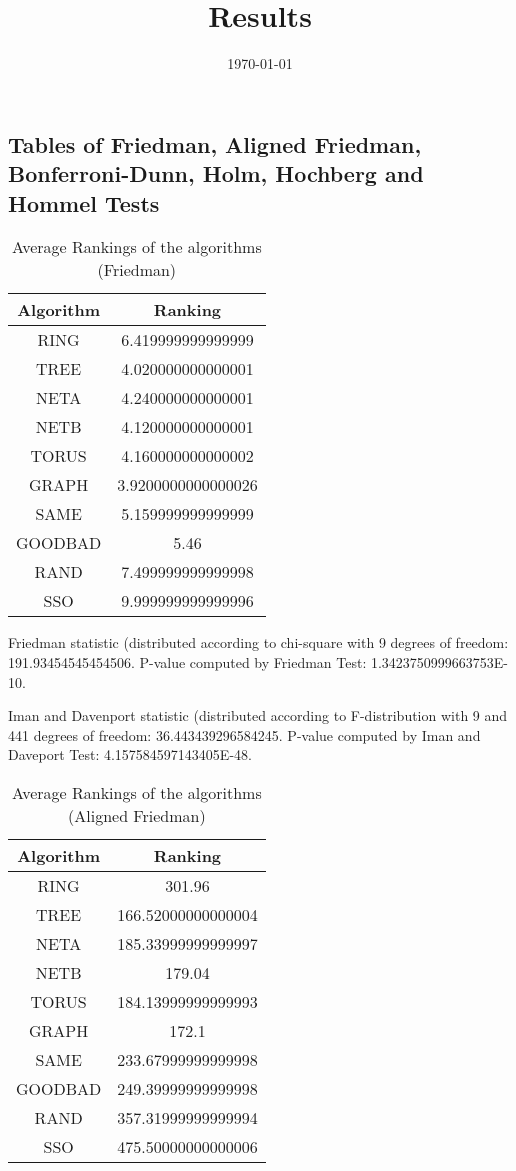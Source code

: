 \documentclass[a4paper,10pt]{article}
\title{Results}
\author{}
\date{\today}
\begin{document}
\begin{landscape}
\oddsidemargin 0in \topmargin 0in\maketitle
\section{Tables of Friedman, Aligned Friedman, Bonferroni-Dunn, Holm, Hochberg and Hommel Tests}
\begin{table}[!htp]
\centering
\caption{Average Rankings of the algorithms (Friedman)
}\begin{tabular}{c|c}
Algorithm&Ranking\\
\hline
 RING&6.419999999999999\\
 TREE&4.020000000000001\\
 NETA&4.240000000000001\\
 NETB&4.120000000000001\\
 TORUS&4.160000000000002\\
 GRAPH&3.9200000000000026\\
 SAME&5.159999999999999\\
 GOODBAD&5.46\\
 RAND&7.499999999999998\\
 SSO&9.999999999999996\\
\end{tabular}
\end{table}


Friedman statistic (distributed according to chi-square with 9 degrees of freedom: 191.93454545454506. 
P-value computed by Friedman Test: 1.3423750999663753E-10.\newline

Iman and Davenport statistic (distributed according to F-distribution with 9 and 441 degrees of freedom: 36.443439296584245. 
P-value computed by Iman and Daveport Test: 4.157584597143405E-48.\newline


\newpage

\begin{table}[!htp]
\centering
\caption{Average Rankings of the algorithms (Aligned Friedman)
}\begin{tabular}{c|c}
Algorithm&Ranking\\
\hline
 RING&301.96\\
 TREE&166.52000000000004\\
 NETA&185.33999999999997\\
 NETB&179.04\\
 TORUS&184.13999999999993\\
 GRAPH&172.1\\
 SAME&233.67999999999998\\
 GOODBAD&249.39999999999998\\
 RAND&357.31999999999994\\
 SSO&475.50000000000006\\
\end{tabular}
\end{table}



\end{landscape}
\end{document}
